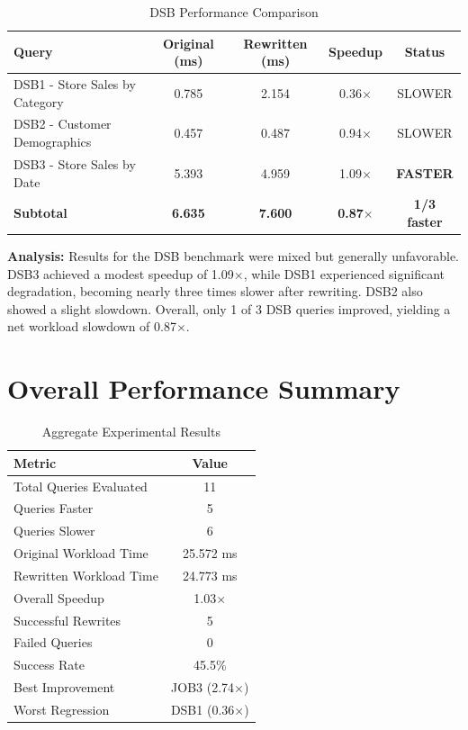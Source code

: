 \documentclass[12pt,a4paper]{article}
\begin{document}
\begin{table}[H]
\centering
\caption{DSB Performance Comparison}
\begin{tabular}{|l|c|c|c|c|}
\hline
\textbf{Query} & \textbf{Original (ms)} & \textbf{Rewritten (ms)} & \textbf{Speedup} & \textbf{Status} \\
\hline
DSB1 - Store Sales by Category & 0.785 & 2.154 & 0.36$\times$ & SLOWER \\
DSB2 - Customer Demographics & 0.457 & 0.487 & 0.94$\times$ & SLOWER \\
DSB3 - Store Sales by Date & 5.393 & 4.959 & 1.09$\times$ & \textbf{FASTER} \\
\hline
\textbf{Subtotal} & \textbf{6.635} & \textbf{7.600} & \textbf{0.87$\times$} & \textbf{1/3 faster} \\
\hline
\end{tabular}
\end{table}

\textbf{Analysis:} Results for the DSB benchmark were mixed but generally unfavorable. DSB3 achieved a modest speedup of 1.09$\times$, while DSB1 experienced significant degradation, becoming nearly three times slower after rewriting. DSB2 also showed a slight slowdown. Overall, only 1 of 3 DSB queries improved, yielding a net workload slowdown of 0.87$\times$.

\section{Overall Performance Summary}

\begin{table}[H]
\centering
\caption{Aggregate Experimental Results}
\begin{tabular}{|l|c|}
\hline
\textbf{Metric} & \textbf{Value} \\
\hline
Total Queries Evaluated & 11 \\
Queries Faster & 5 \\
Queries Slower & 6 \\
Original Workload Time & 25.572 ms \\
Rewritten Workload Time & 24.773 ms \\
Overall Speedup & 1.03$\times$ \\
Successful Rewrites & 5 \\
Failed Queries & 0 \\
Success Rate & 45.5\% \\
Best Improvement & JOB3 (2.74$\times$) \\
Worst Regression & DSB1 (0.36$\times$) \\
\hline
\end{tabular}
\end{table}
\end{document}

